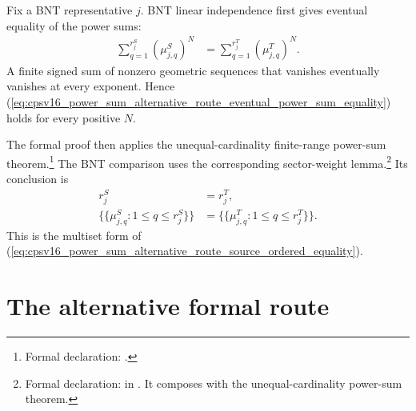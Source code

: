 \documentclass{article}
\begin{document}
Fix a BNT representative $j$. BNT linear independence first gives eventual
equality of the power sums:
\begin{align}
    \sum_{q=1}^{r_j^S}(\mu^S_{j,q})^N
        &=\sum_{q=1}^{r_j^T}(\mu^T_{j,q})^N.
    \label{eq:cpsv16_power_sum_alternative_route_eventual_power_sum_equality}
\end{align}
A finite signed sum of nonzero geometric sequences that vanishes eventually
vanishes at every exponent. Hence
(\ref{eq:cpsv16_power_sum_alternative_route_eventual_power_sum_equality}) holds
for every positive $N$.

The formal proof then applies the unequal-cardinality finite-range power-sum
theorem.\footnote{Formal declaration:
.}
The BNT comparison uses the corresponding sector-weight lemma.\footnote{Formal
declaration:  in
. It composes
with the unequal-cardinality power-sum theorem.}
Its conclusion is
\begin{align}
    r_j^S
        &=r_j^T,
    \label{eq:cpsv16_power_sum_alternative_route_formal_cardinality}\\
    \{\!\{\mu^S_{j,q}:1\leq q\leq r_j^S\}\!\}
        &=\{\!\{\mu^T_{j,q}:1\leq q\leq r_j^T\}\!\}.
    \label{eq:cpsv16_power_sum_alternative_route_formal_multiset}
\end{align}
This is the multiset form of
(\ref{eq:cpsv16_power_sum_alternative_route_source_ordered_equality}).

\section{The alternative formal route}
\end{document}
